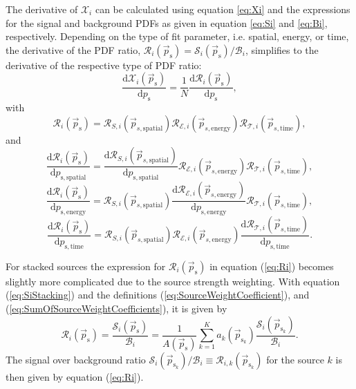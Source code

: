 \documentclass{article}
\newcommand{\ps}{\vec{p}_{\mathrm{s}}}
\newcommand{\psk}{\vec{p}_{\mathrm{s}_k}}
\begin{document}
The derivative of $\mathcal{X}_i$ can be calculated using
equation \ref{eq:Xi} and the expressions for the signal and background PDFs as given
in equation \ref{eq:Si} and \ref{eq:Bi}, respectively. Depending on the type of
fit parameter, i.e. spatial, energy, or time, the derivative of the PDF ratio,
$\mathcal{R}_i(\ps) = \mathcal{S}_i(\ps) / \mathcal{B}_i$, simplifies to the
derivative of the respective type of PDF ratio:
\begin{equation}
 \frac{\mathrm{d} \mathcal{X}_i(\ps)}{\mathrm{d} p_{\mathrm{s}}} = \frac{1}{N}\frac{\mathrm{d} \mathcal{R}_i(\ps)}{\mathrm{d} p_{\mathrm{s}}},
\end{equation}
with
\begin{equation}
 \mathcal{R}_i(\ps) = \mathcal{R}_{S,i}(\vec{p}_{s,\mathrm{spatial}}) \mathcal{R}_{\mathcal{E},i}(\vec{p}_{s,\mathrm{energy}}) \mathcal{R}_{\mathcal{T},i}(\vec{p}_{s,\mathrm{time}}),
 \label{eq:Ri}
\end{equation}
and
\begin{equation}
 \frac{\mathrm{d} \mathcal{R}_i(\ps)}{\mathrm{d} p_{\mathrm{s,spatial}}} = \frac{\mathrm{d} \mathcal{R}_{S,i}(\vec{p}_{s,\mathrm{spatial}})}{\mathrm{d} p_{\mathrm{s,spatial}}} \mathcal{R}_{\mathcal{E},i}(\vec{p}_{s,\mathrm{energy}}) \mathcal{R}_{\mathcal{T},i}(\vec{p}_{s,\mathrm{time}}),
\end{equation}
\begin{equation}
 \frac{\mathrm{d} \mathcal{R}_i(\ps)}{\mathrm{d} p_{\mathrm{s,energy}}} = \mathcal{R}_{S,i}(\vec{p}_{s,\mathrm{spatial}}) \frac{\mathrm{d} \mathcal{R}_{\mathcal{E},i}(\vec{p}_{s,\mathrm{energy}})}{\mathrm{d} p_{\mathrm{s,energy}}} \mathcal{R}_{\mathcal{T},i}(\vec{p}_{s,\mathrm{time}}),
\end{equation}
\begin{equation}
 \frac{\mathrm{d} \mathcal{R}_i(\ps)}{\mathrm{d} p_{\mathrm{s,time}}} = \mathcal{R}_{S,i}(\vec{p}_{s,\mathrm{spatial}}) \mathcal{R}_{\mathcal{E},i}(\vec{p}_{s,\mathrm{energy}}) \frac{\mathrm{d} \mathcal{R}_{\mathcal{T},i}(\vec{p}_{s,\mathrm{time}})}{\mathrm{d} p_{\mathrm{s,time}}}.
\end{equation}

For stacked sources the expression for $\mathcal{R}_i(\ps)$ in equation (\ref{eq:Ri})
becomes slightly more complicated due to the source strength weighting.
With equation (\ref{eq:SiStacking}) and the definitions
(\ref{eq:SourceWeightCoefficient}), and
(\ref{eq:SumOfSourceWeightCoefficients}), it is given by
\begin{equation}
\mathcal{R}_i(\ps) = \frac{\mathcal{S}_i(\ps)}{\mathcal{B}_i} = \frac{1}{A(\ps)} \sum_{k=1}^{K} a_k(\psk) \frac{\mathcal{S}_{i}(\psk)}{\mathcal{B}_{i}}.
\label{eq:RiStacking}
\end{equation}
The signal over background ratio $\mathcal{S}_{i}(\psk) / \mathcal{B}_{i} \equiv \mathcal{R}_{i,k}(\psk)$
for the source $k$ is then given by equation (\ref{eq:Ri}).
\end{document}
